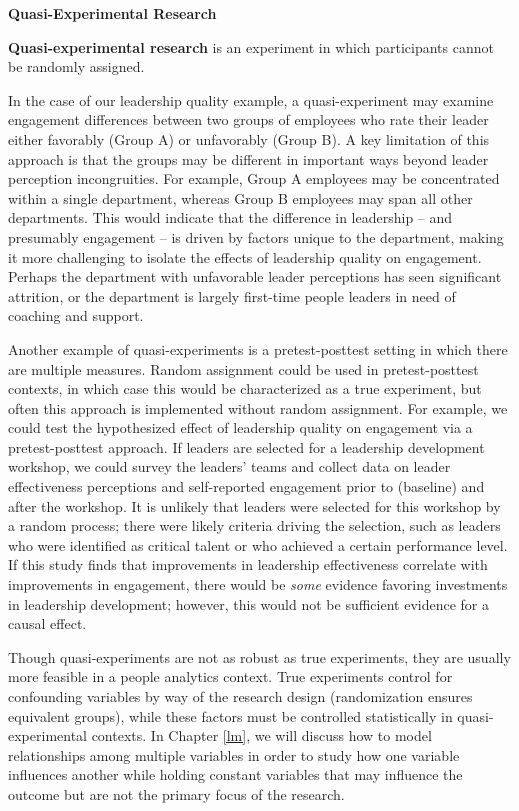 \documentclass[
]{book}
\begin{document}
\textbf{Quasi-Experimental Research}

\textbf{Quasi-experimental research} is an experiment in which participants cannot be randomly assigned.

In the case of our leadership quality example, a quasi-experiment may examine engagement differences between two groups of employees who rate their leader either favorably (Group A) or unfavorably (Group B). A key limitation of this approach is that the groups may be different in important ways beyond leader perception incongruities. For example, Group A employees may be concentrated within a single department, whereas Group B employees may span all other departments. This would indicate that the difference in leadership -- and presumably engagement -- is driven by factors unique to the department, making it more challenging to isolate the effects of leadership quality on engagement. Perhaps the department with unfavorable leader perceptions has seen significant attrition, or the department is largely first-time people leaders in need of coaching and support.

Another example of quasi-experiments is a pretest-posttest setting in which there are multiple measures. Random assignment could be used in pretest-posttest contexts, in which case this would be characterized as a true experiment, but often this approach is implemented without random assignment. For example, we could test the hypothesized effect of leadership quality on engagement via a pretest-posttest approach. If leaders are selected for a leadership development workshop, we could survey the leaders' teams and collect data on leader effectiveness perceptions and self-reported engagement prior to (baseline) and after the workshop. It is unlikely that leaders were selected for this workshop by a random process; there were likely criteria driving the selection, such as leaders who were identified as critical talent or who achieved a certain performance level. If this study finds that improvements in leadership effectiveness correlate with improvements in engagement, there would be \emph{some} evidence favoring investments in leadership development; however, this would not be sufficient evidence for a causal effect.

Though quasi-experiments are not as robust as true experiments, they are usually more feasible in a people analytics context. True experiments control for confounding variables by way of the research design (randomization ensures equivalent groups), while these factors must be controlled statistically in quasi-experimental contexts. In Chapter \ref{lm}, we will discuss how to model relationships among multiple variables in order to study how one variable influences another while holding constant variables that may influence the outcome but are not the primary focus of the research.
\end{document}

